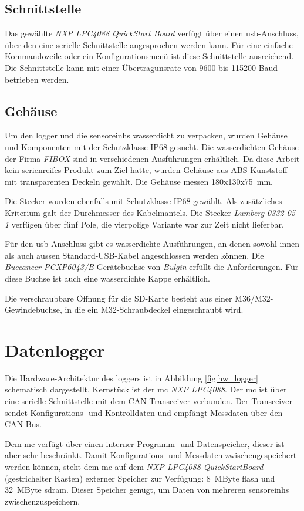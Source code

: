 \subsection{Schnittstelle}
Das gewählte \emph{NXP LPC4088 QuickStart Board} verfügt über einen \gls{usb}-Anschluss, über den eine serielle Schnittstelle angesprochen werden kann. Für eine einfache Kommandozeile oder ein Konfigurationsmenü ist diese Schnittstelle ausreichend. Die Schnittstelle kann mit einer Übertragunsrate von 9600 bis 115200 Baud betrieben werden. 


\subsection{Gehäuse}
Um den \gls{logger} und die \glspl{sensoreinh} wasserdicht zu verpacken, wurden Gehäuse und Komponenten mit der Schutzklasse IP68 gesucht. Die wasserdichten Gehäuse der Firma \emph{FIBOX} sind in verschiedenen Ausführungen erhältlich. Da diese Arbeit kein serienreifes Produkt zum Ziel hatte, wurden Gehäuse aus ABS-Kunststoff mit transparenten Deckeln gewählt. Die Gehäuse messen 180x130x75~mm.

Die Stecker wurden ebenfalls mit Schutzklasse IP68 gewählt. Als zusätzliches Kriterium galt der Durchmesser des Kabelmantels. Die Stecker \emph{Lumberg 0332 05-1} verfügen über fünf Pole, die vierpolige Variante war zur Zeit nicht lieferbar.

Für den \gls{usb}-Anschluss gibt es wasserdichte Ausführungen, an denen sowohl innen als auch aussen Standard-USB-Kabel angeschlossen werden können. Die \emph{Buccaneer PCXP6043/B}-Gerätebuchse von \emph{Bulgin} erfüllt die Anforderungen. Für diese Buchse ist auch eine wasserdichte Kappe erhältlich.

Die verschraubbare Öffnung für die SD-Karte besteht aus einer M36/M32-Gewindebuchse, in die ein M32-Schraubdeckel eingeschraubt wird.


\section{Datenlogger}
Die Hardware-Architektur des \gls{logger}s ist in Abbildung \ref{fig.hw_logger} schematisch dargestellt. Kernstück ist der \gls{mc} \emph{NXP LPC4088}. Der \gls{mc} ist über eine serielle Schnittstelle mit dem CAN-Transceiver verbunden. Der Transceiver sendet Konfigurations- und Kontrolldaten und empfängt Messdaten über den CAN-Bus.

Dem \gls{mc} verfügt über einen interner Programm- und Datenspeicher, dieser ist aber sehr beschränkt. Damit Konfigurations- und Messdaten zwischengespeichert werden können, steht dem \gls{mc} auf dem \emph{NXP LPC4088 QuickStartBoard} (gestrichelter Kasten) externer Speicher zur Verfügung: 8~MByte \gls{flash} und 32~MByte \gls{sdram}. Dieser Speicher genügt, um Daten von mehreren \glspl{sensoreinh} zwischenzuspeichern.

